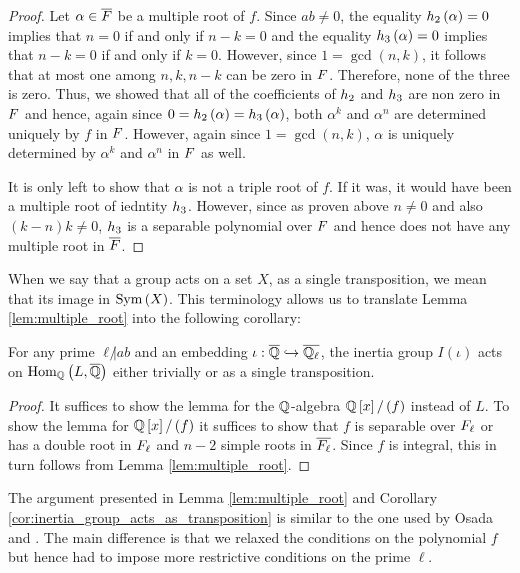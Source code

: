 \documentclass[../main.tex]{subfiles}
\begin{document}
\begin{proof}
  Let $\alpha \in \overline{F}$ be a multiple root of $f$.
  Since $ab \neq 0$, the equality $h_{2}\left( \alpha \right) = 0$ implies that $n = 0$ if and only if $n - k = 0$ and the equality $h_{3}\left( \alpha \right) = 0$ implies that $n - k = 0$ if and only if $k = 0$.
  However, since $1 = \gcd\left( n, k \right)$, it follows that at most one among $n, k, n - k$ can be zero in $F$.
  Therefore, none of the three is zero.
  Thus, we showed that all of the coefficients of $h_{2}$ and $h_{3}$ are non zero in $F$ and hence, again since $0 = h_{2}\left( \alpha \right) = h_{3}\left( \alpha \right)$, both $\alpha^k$ and $\alpha^n$ are determined uniquely by $f$ in $F$.
  However, again since $1 = \gcd\left( n, k \right)$, $\alpha$ is uniquely determined by $\alpha^k$ and $\alpha^n$ in $F$ as well. 

  It is only left to show that $\alpha$ is not a triple root of $f$. 
  If it was, it would have been a multiple root of iedntity $h_{3}$.
  However, since as proven above $n \neq 0$ and also $\left( k - n \right)k \neq 0$, $h_{3}$ is a separable polynomial over $F$ and hence does not have any multiple root in $\overline{F}$.
\end{proof}

When we say that a group acts on a set $X$, as a single transposition, we mean that its image in $\operatorname{\rm Sym}\left( X \right)$.
This terminology allows us to translate Lemma \ref{lem:multiple_root} into the following corollary:
\begin{corollary}
  \label{cor:inertia_group_acts_as_transposition}
  For any prime $\ell \not | ab$ and an embedding $\iota: \overline{\mathbb{Q}} \hookrightarrow \overline{\mathbb{Q}_\ell}$, the inertia group $I\left( \iota \right)$ acts on $\operatorname{\rm Hom}_{\mathbb{Q}}\left( L, \overline{\mathbb{Q}} \right)$ either trivially or as a single transposition.
\end{corollary}
\begin{proof}
  It suffices to show the lemma for the $\mathbb{Q}$-algebra $\mathbb{Q}\left[ x \right] / \left( f \right)$ instead of $L$.
  To show the lemma for $\mathbb{Q}\left[ x \right] / \left( f \right)$ it suffices to show that $f$ is separable over $F_\ell$ or has a double root in $F_\ell$ and $n-2$ simple roots in $\overline{F_\ell}$.
  Since $f$ is integral, this in turn follows from Lemma \ref{lem:multiple_root}.
\end{proof}
\begin{remark}
  The argument presented in Lemma \ref{lem:multiple_root} and Corollary \ref{cor:inertia_group_acts_as_transposition} is similar to the one used by Osada \cite[Lemma 1]{Osada1987TheGG} and \cite[Lemma 3]{Osada1987TheGG}.
  The main difference is that we relaxed the conditions on the polynomial $f$ but hence had to impose more restrictive conditions on the prime $\ell$. 
\end{remark}
\end{document}
